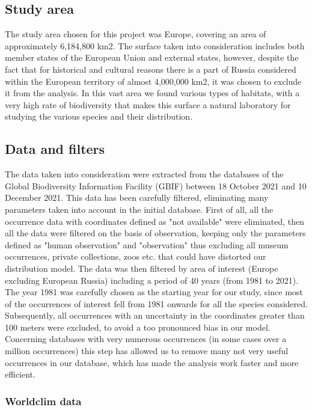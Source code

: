 \documentclass[12pt,a4paper]{article}
\begin{document}
\subsection{Study area}
The study area chosen for this project was Europe, covering an area of approximately 6,184,800 km2.
The surface taken into consideration includes both member states of the European Union and external states, however, despite the fact that for historical and cultural reasons there is a part of Russia considered within the European territory of almost 4,000,000 km2, it was chosen to exclude it from the analysis.
In this vast area we found various types of habitats, with a very high rate of biodiversity that makes this surface a natural laboratory for studying the various species and their distribution.

\subsection{Data and filters}
The data taken into consideration were extracted from the databases of the Global Biodiversity Information Facility (GBIF) \citep{gbif} between 18 October 2021 and 10 December 2021.
This data has been carefully filtered, eliminating many parameters taken into account in the initial database.
First of all, all the occurrence data with coordinates defined as "not available" were eliminated, then all the data were filtered on the basis of observation, keeping only the parameters defined as "human observation" and "observation" thus excluding all museum occurrences, private collections, zoos etc. that could have distorted our distribution model.
The data was then filtered by area of interest (Europe excluding European Russia) including a period of 40 years (from 1981 to 2021).
The year 1981 was carefully chosen as the starting year for our study, since most of the occurrences of interest fell from 1981 onwards for all the species considered.
Subsequently, all occurrences with an uncertainty in the coordinates greater than 100 meters were excluded, to avoid a too pronounced bias in our model.
Concerning databases with very numerous occurrences (in some cases over a million occurrences) this step has allowed us to remove many not very useful occurrences in our database, which has made the analysis work faster and more efficient.

\subsubsection{Worldclim data}
\end{document}
